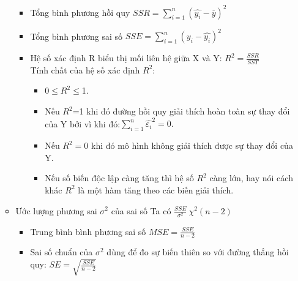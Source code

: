 \documentclass[a4paper]{article}
\theoremstyle{definition}
\begin{document}
\begin{itemize}
\begin{itemize}
\begin{itemize}
        \item Tổng bình phương hồi quy $SSR=\displaystyle\sum_{i=1}^{n}(\hat{y_i}-\overline{y})^2$
        \item Tổng bình phương sai số $SSE=\displaystyle\sum_{i=1}^{n}(y_i-\hat{y_i})^2$
        \item Hệ số xác định R biểu thị mối liên hệ giữa X và Y: $R^2=\frac{SSR}{SST}$\\
         Tính chất của hệ số xác định $R^2$:
	    \begin{itemize}
	        \item 0$\leq R^2 \leq$1.
	        \item Nếu $R^2$=1 khi đó đường hồi quy giải thích hoàn toàn sự thay đổi của Y bởi vì khi đó:$\displaystyle\sum_{i=1}^{n}\hat{\varepsilon_i}^2=0.$
	        \item Nếu $R^2=0$ khi đó mô hình không giải thích được sự thay đổi của Y.
	        \item Nếu số biến độc lập càng tăng thì hệ số $R^2$ càng lớn, hay nói cách khác $R^2$ là một hàm tăng theo các biến giải thích.\\
	    \end{itemize}
    \end{itemize}
\item Ước lượng phương sai $\sigma^2$ của sai số
Ta có $\frac{SSE}{\sigma^2}~\chi^2(n-2)$
\begin{itemize}
    \item Trung bình bình phương sai số $MSE=\frac{SSE}{n-2}$
    \item Sai số chuẩn của $\sigma^2$ dùng để đo sự biến thiên so với đường thẳng hồi quy: $SE=\sqrt{\frac{SSE}{n-2}}$
     

\end{itemize}
\end{itemize}
\end{itemize}
\end{document}
